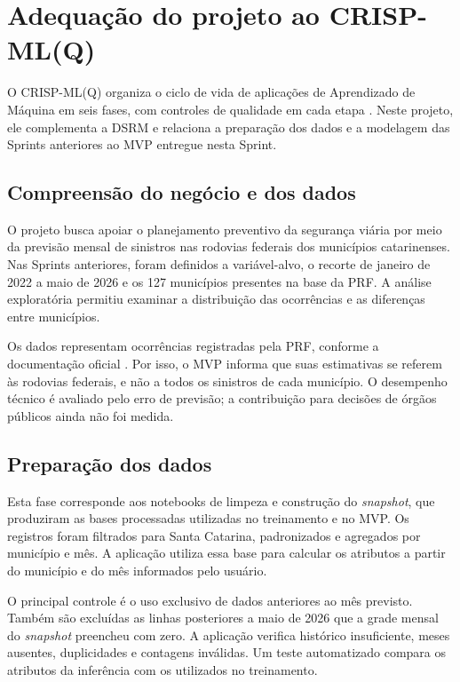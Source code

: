 \documentclass[12pt]{article}
\begin{document}
\section{Adequação do projeto ao CRISP-ML(Q)}
\label{sec:crispmlq}

O CRISP-ML(Q) organiza o ciclo de vida de aplicações de Aprendizado de Máquina em seis fases, com controles de qualidade em cada etapa \cite{studer2021crispmlq}. Neste projeto, ele complementa a DSRM e relaciona a preparação dos dados e a modelagem das Sprints anteriores ao MVP entregue nesta Sprint.

\subsection{Compreensão do negócio e dos dados}

O projeto busca apoiar o planejamento preventivo da segurança viária por meio da previsão mensal de sinistros nas rodovias federais dos municípios catarinenses. Nas Sprints anteriores, foram definidos a variável-alvo, o recorte de janeiro de 2022 a maio de 2026 e os 127 municípios presentes na base da PRF. A análise exploratória permitiu examinar a distribuição das ocorrências e as diferenças entre municípios.

Os dados representam ocorrências registradas pela PRF, conforme a documentação oficial \cite{prf2026portal}. Por isso, o MVP informa que suas estimativas se referem às rodovias federais, e não a todos os sinistros de cada município. O desempenho técnico é avaliado pelo erro de previsão; a contribuição para decisões de órgãos públicos ainda não foi medida.

\subsection{Preparação dos dados}

Esta fase corresponde aos notebooks de limpeza e construção do \textit{snapshot}, que produziram as bases processadas utilizadas no treinamento e no MVP. Os registros foram filtrados para Santa Catarina, padronizados e agregados por município e mês. A aplicação utiliza essa base para calcular os atributos a partir do município e do mês informados pelo usuário.

O principal controle é o uso exclusivo de dados anteriores ao mês previsto. Também são excluídas as linhas posteriores a maio de 2026 que a grade mensal do \textit{snapshot} preencheu com zero. A aplicação verifica histórico insuficiente, meses ausentes, duplicidades e contagens inválidas. Um teste automatizado compara os atributos da inferência com os utilizados no treinamento.
\end{document}
